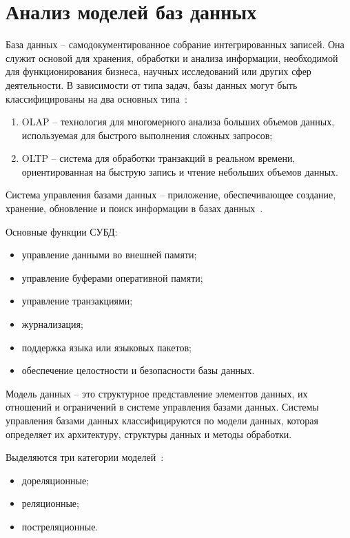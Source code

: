 \section{Анализ моделей баз данных}

База данных -- самодокументированное собрание интегрированных записей. Она служит основой для хранения, обработки и анализа информации, необходимой для функционирования бизнеса, научных исследований или других сфер деятельности. В зависимости от типа задач, базы данных могут быть классифицированы на два основных типа~\cite{lit7, lit8}:
\begin{enumerate}
	\item OLAP -- технология для многомерного анализа больших объемов данных, используемая для быстрого выполнения сложных запросов;
	\item OLTP -- система для обработки транзакций в реальном времени, ориентированная на быструю запись и чтение небольших объемов данных.
\end{enumerate}

Система управления базами данных -- приложение, обеспечивающее создание,
хранение, обновление и поиск информации в базах данных~\cite{lit8}.

Основные функции СУБД:
\begin{itemize}[label=--]
	\item управление данными во внешней памяти;
	\item управление буферами оперативной памяти;
	\item управление транзакциями;
	\item журнализация;
	\item поддержка языка или языковых пакетов;
	\item обеспечение целостности и безопасности базы данных.
\end{itemize}

Модель данных -- это структурное представление элементов данных, их отношений и ограничений в системе управления базами данных. Системы управления базами данных  классифицируются по модели данных, которая определяет их архитектуру, структуры данных и методы обработки. 

\newpage

Выделяются три категории моделей~\cite{lit7, lit8}: 
\begin{itemize}[label=--]
	\item дореляционные;
	\item реляционные;
	\item постреляционные.
\end{itemize}

